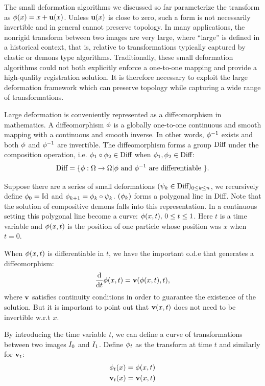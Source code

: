 \documentclass[letterpaper,12pt]{article}
\begin{document}
The small deformation algorithms we discussed so far parameterize the
transform as $\phi(x) = x + \mathbf{u}(x)$. Unless $\mathbf{u}(x)$ is close to
zero, such a form is not necessarily invertible and in general cannot
preserve topology. In many applications, the nonrigid transform
between two images are very large, where ``large'' is defined in a
historical context, that is, relative to transformations typically
captured by elastic or demons type algorithms. Traditionally, these
small deformation algorithms could not both explicitly enforce a
one-to-one mapping and provide a high-quality registration
solution. It is therefore necessary to exploit the large deformation
framework which can preserve topology while capturing a wide range of transformations.

Large deformation is conveniently represented as a diffeomorphism in
mathematics. A diffeomorphism $\phi$ is a globally one-to-one
continuous and smooth mapping with a continuous and smooth inverse. In other words, $\phi^{-1}$ exists and both $\phi$ and $\phi^{-1}$ are invertible. The diffeomorphism forms a group $\text{Diff}$ under the composition operation, i.e. $\phi_1 \circ \phi_2 \in \text{Diff}$ when $\phi_1, \phi_2 \in \text{Diff}$:
\begin{align}
\text{Diff} = \{ \phi: \Omega \to \Omega | \phi \text{ and } \phi^{-1} \text{ are differentiable }\}.
\end{align}

Suppose there are a series of small deformations $(\psi_k \in \text{Diff})_{0 \leq k \leq n}$, we recursively define $\phi_0 = \text{Id}$ and $\phi_{k+1} = \phi_{k} \circ \psi_{k}$.  $(\phi_{k})$ forms a polygonal line in $\text{Diff}$. Note that the solution of compositive demons falls into this representation. In a continuous setting this polygonal line become a curve: $\phi(x, t), \, 0 \leq t \leq 1$. Here $t$ is a time variable and $\phi(x, t)$ is the position of one particle whose position was $x$ when $t=0$.

When $\phi(x, t)$ is differentiable in $t$, we have the important o.d.e that generates a diffeomorphism:
\begin{align}
\frac{\text{d}}{\text{d} t} \phi(x, t) = \mathbf{v}(\phi(x, t), t), 
\label{eq:ode}
\end{align}
where $\mathbf{v}$ satisfies continuity conditions in order to guarantee the
existence of the solution. But it is important to point out that
$\mathbf{v}(x,t)$ does not need to be invertible w.r.t $x$.

By introducing the time variable $t$, we can define a curve of transformations between two images $I_0$ and $I_1$. Define $\phi_t$ as the transform at time $t$ and similarly for $\mathbf{v}_t$:
\begin{align}
& \phi_t(x) = \phi(x, t) \\
& \mathbf{v}_t(x) = \mathbf{v}(x, t) 
\end{align}
\end{document}
